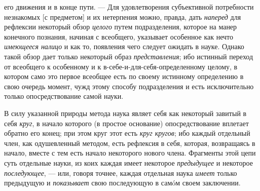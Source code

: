 \documentclass[twoside]{article}
\begin{document}
{{его движения и в конце пути. — Для удовлетворения
субъективной потребности незнакомых [с предметом] и их нетерпения можно,
правда, дать {\em наперед}
для рефлексии некоторый обзор
{\em целого} путем
подразделения, которое на манер конечного познания, начиная с всеобщего,
указывает особенное как нечто
{\em имеющееся налицо} и
как то, появления чего следует ожидать в науке. Однако такой обзор дает
только некоторый образ
{\em представления}; ибо
истинный переход от всеобщего к особенному и к
в-себе-и-для-себя-определенному целому, в котором само это первое всеобщее
есть по своему истинному определению в свою очередь момент, чужд этому
способу подразделения и есть исключительно только опосредствование самой
науки.

В силу указанной природы метода наука являет себя как
некоторый завитый в себя {\em круг},
в начало которого (в простое основание) опосредствование
вплетает обратно его конец; при этом круг этот есть
{\em круг кругов}; ибо
каждый отдельный член, как одушевленный методом, есть рефлексия в себя,
которая, возвращаясь в начало, вместе с тем есть начало некоторого нового
члена. Фрагменты этой цепи суть отдельные науки, из коих каждая имеет
некоторое {\em предыдущее}
и некоторое
{\em последующее}, — или,
говоря точнее, каждая отдельная наука
{\em имеет} только
предыдущую и {\em показывает}
свою последующую в самóм своем заключении.

}}
\end{document}
